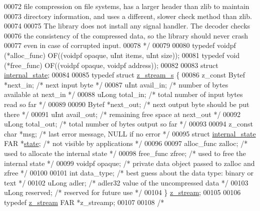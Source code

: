 \begin{DoxyCode}
00072 \textcolor{comment}{  file compression on file systems, has a larger header than zlib to maintain}
00073 \textcolor{comment}{  directory information, and uses a different, slower check method than zlib.}
00074 \textcolor{comment}{}
00075 \textcolor{comment}{    The library does not install any signal handler.  The decoder checks}
00076 \textcolor{comment}{  the consistency of the compressed data, so the library should never crash}
00077 \textcolor{comment}{  even in case of corrupted input.}
00078 \textcolor{comment}{*/}
00079 
00080 \textcolor{keyword}{typedef} voidpf (*alloc\_func) OF((voidpf opaque, uInt items, uInt size));
00081 \textcolor{keyword}{typedef} void   (*free\_func)  OF((voidpf opaque, voidpf address));
00082 
00083 \textcolor{keyword}{struct }\hyperlink{structinternal__state}{internal\_state};
00084 
00085 \textcolor{keyword}{typedef} \textcolor{keyword}{struct }\hyperlink{structz__stream__s}{z\_stream\_s} \{
00086     z\_const Bytef *next\_in;     \textcolor{comment}{/* next input byte */}
00087     uInt     avail\_in;  \textcolor{comment}{/* number of bytes available at next\_in */}
00088     uLong    total\_in;  \textcolor{comment}{/* total number of input bytes read so far */}
00089 
00090     Bytef    *next\_out; \textcolor{comment}{/* next output byte should be put there */}
00091     uInt     avail\_out; \textcolor{comment}{/* remaining free space at next\_out */}
00092     uLong    total\_out; \textcolor{comment}{/* total number of bytes output so far */}
00093 
00094     z\_const \textcolor{keywordtype}{char} *msg;  \textcolor{comment}{/* last error message, NULL if no error */}
00095     \textcolor{keyword}{struct }\hyperlink{structinternal__state}{internal\_state} FAR *\hyperlink{structstate}{state}; \textcolor{comment}{/* not visible by applications */}
00096 
00097     alloc\_func zalloc;  \textcolor{comment}{/* used to allocate the internal state */}
00098     free\_func  zfree;   \textcolor{comment}{/* used to free the internal state */}
00099     voidpf     opaque;  \textcolor{comment}{/* private data object passed to zalloc and zfree */}
00100 
00101     \textcolor{keywordtype}{int}     data\_type;  \textcolor{comment}{/* best guess about the data type: binary or text */}
00102     uLong   adler;      \textcolor{comment}{/* adler32 value of the uncompressed data */}
00103     uLong   reserved;   \textcolor{comment}{/* reserved for future use */}
00104 \} \hyperlink{structz__stream__s}{z\_stream};
00105 
00106 \textcolor{keyword}{typedef} \hyperlink{structz__stream__s}{z\_stream} FAR *z\_streamp;
00107 
00108 \textcolor{comment}{/*}

\end{DoxyCode}
